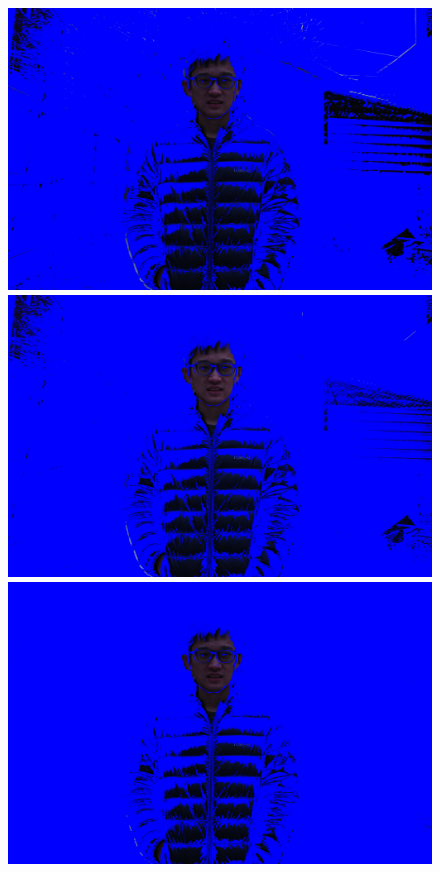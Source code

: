 \documentclass[final]{cvpr}
\begin{document}
\begin{figure}[ht]
   \centering
   \includegraphics[scale=0.03]{../data/output/arthas_final_nf_1.2_0.07_10_10.JPG}
   \includegraphics[scale=0.03]{../data/output/arthas_final_nf_1.2_0.10_10_10.JPG}
   \includegraphics[scale=0.03]{../data/output/arthas_final_nf_1.2_0.15_10_10.JPG}

\end{figure}
\end{document}

